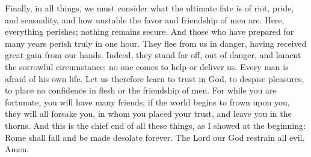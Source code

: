 Finally, in all things, we must consider what the ultimate fate is of riot, pride, and sensuality, and how unstable the favor and friendship of men are. Here, everything perishes; nothing remains secure. And those who have prepared for many years perish truly in one hour. They flee from us in danger, having received great gain from our hands. Indeed, they stand far off, out of danger, and lament the sorrowful circumstance; no one comes to help or deliver us. Every man is afraid of his own life. Let us therefore learn to trust in God, to despise pleasures, to place no confidence in flesh or the friendship of men. For while you are fortunate, you will have many friends; if the world begins to frown upon you, they will all forsake you, in whom you placed your trust, and leave you in the thorns. And this is the chief end of all these things, as I showed at the beginning: Rome shall fall and be made desolate forever. The Lord our God restrain all evil. Amen.
